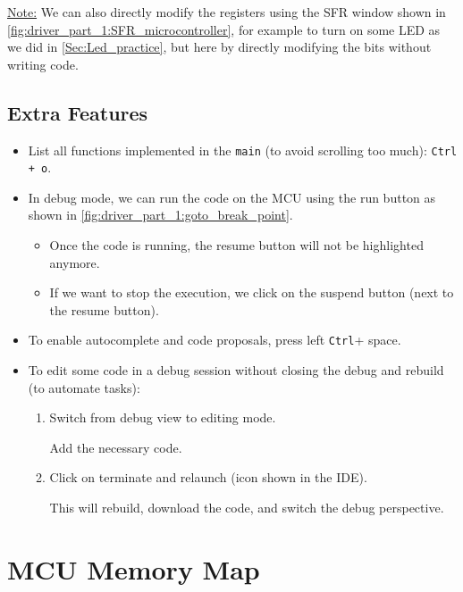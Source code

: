 \underline{Note:} We can also directly modify the registers using the SFR window shown in \autoref{fig:driver_part_1:SFR_microcontroller}, for example to turn on some LED as we did in \autoref{Sec:Led_practice}, but here by directly modifying the bits without writing code.


\subsection{Extra Features}

\begin{itemize}
    \item List all functions implemented in the \verb|main| (to avoid scrolling too much): \verb|Ctrl + o|.


    \item In debug mode, we can run the code on the MCU using the run button as shown in \autoref{fig:driver_part_1:goto_break_point}.

    \begin{itemize}
        \item Once the code is running, the resume button will not be highlighted anymore.

        \item If we want to stop the execution, we click on the suspend button (next to the resume button).
    \end{itemize}


    \item To enable autocomplete and code proposals, press left \verb|Ctrl|+ space.

    \item To edit some code in a debug session without closing the debug and rebuild (to automate tasks):

    \begin{enumerate}
        \item Switch from debug view to editing mode. 

        Add the necessary code.

        \item Click on terminate and relaunch (icon shown in the IDE).


        This will rebuild, download the code, and switch the debug perspective. 
    \end{enumerate}

    
\end{itemize}


\newpage
\section{MCU Memory Map}

